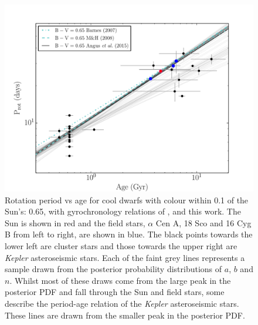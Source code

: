 \begin{figure}
\begin{center}
\includegraphics[width=6in, clip=true, trim=0 0 0.5in 0]{figures/p_vs_a_solar.pdf}
\caption[A new gyrochronology relation: period vs age.]
{Rotation period vs age for cool dwarfs with colour within 0.1 of the
	Sun's: 0.65, with gyrochronology relations of \citet{Barnes2007},
	\citet{Mamajek2008} and this work.
	The Sun is shown in red and the
	field stars, $\alpha$ Cen A, 18 Sco and 16 Cyg B from left to right,
	are shown in blue.
	The black points towards the lower left are cluster stars and those
	towards the upper right are {\it Kepler} asteroseismic stars.
	Each of the faint grey lines represents a
	sample drawn from the posterior probability distributions of $a$, $b$
	and $n$.
	Whilst most of these draws come from the large peak in the posterior
	PDF and fall through the Sun and field stars, some describe the
	period-age relation of the {\it Kepler} asteroseismic stars.
	These lines are drawn from the smaller peak in the posterior PDF.
\label{fig:p_vs_a_solar}}
\end{center}
\end{figure}

